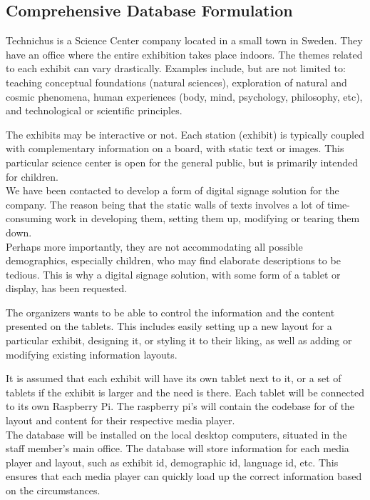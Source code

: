 \documentclass{exam}
\begin{document}
\begin{center}
\section*{Comprehensive Database Formulation}
\end{center}
\bigskip
Technichus is a Science Center company located in a small town in Sweden. They have an office where the entire exhibition takes place indoors. The themes related to each exhibit can vary drastically. Examples include, but are not limited to: teaching conceptual foundations (natural sciences), exploration of natural and cosmic phenomena, human experiences (body, mind, psychology, philosophy, etc), and technological or scientific principles.\\
\bigskip

The exhibits may be interactive or not. Each station (exhibit) is typically coupled with complementary information on a board, with static text or images. This particular science center is open for the general public, but is primarily intended for children.\\
\bigskip
We have been contacted to develop a form of digital signage solution for the company. The reason being that the static walls of texts involves a lot of time-consuming work in developing them, setting them up, modifying or tearing them down.\\
\bigskip
Perhaps more importantly, they are not accommodating all possible demographics, especially children, who may find elaborate descriptions to be tedious. This is why a digital signage solution, with some form of a tablet or display, has been requested.\\
\bigskip

The organizers wants to be able to control the information and the content presented on the tablets. This includes easily setting up a new layout for a particular exhibit, designing it, or styling it to their liking, as well as adding or modifying existing information layouts.\\
\bigskip

It is assumed that each exhibit will have its own tablet next to it, or a set of tablets if the exhibit is larger and the need is there. Each tablet will be connected to its own Raspberry Pi. The raspberry pi's will contain the codebase for of the layout and content for their respective media player.\\
\bigskip
The database will be installed on the local desktop computers, situated in the staff member's main office. The database will store information for each media player and layout, such as exhibit id, demographic id, language id, etc. This ensures that each media player can quickly load up the correct information based on the circumstances.\\
\bigskip
\bigskip
\end{document}
